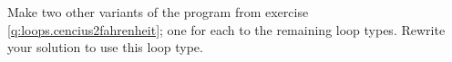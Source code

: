 Make two other variants of the program from exercise \ref{q:loops.cencius2fahrenheit}; one for each to the remaining loop types. Rewrite your solution to use this loop type.
